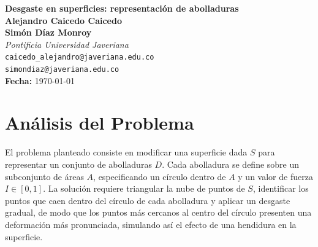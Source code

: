 \documentclass[12pt, letterpaper]{article}
\begin{document}
\begin{titlepage}
    \centering
    \vspace*{2cm}
    
    {\LARGE \textbf{Desgaste en superficies: representación de abolladuras}}\\[0.5cm]
    
    {\large \textbf{Alejandro Caicedo Caicedo}}\\
    {\large \textbf{Simón Díaz Monroy}}\\[0.3cm]
    
    \textit{Pontificia Universidad Javeriana}\\
    \texttt{caicedo\_alejandro@javeriana.edu.co}\\
    \texttt{simondiaz@javeriana.edu.co}\\[2cm]
    
    {\large \textbf{Fecha:} \today}\\[1cm]
    
    \vfill
\end{titlepage}

\newpage
\setcounter{page}{2}
\tableofcontents
\thispagestyle{empty}

\newpage
\setcounter{page}{1}

\pagestyle{fancy}
\fancyhf{}
\cfoot{\thepage}

\section{Análisis del Problema}
El problema planteado consiste en modificar una superficie dada \(S\) para representar un conjunto de abolladuras \(D\). Cada abolladura se define sobre un subconjunto de áreas \(A\), especificando un círculo dentro de \(A\) y un valor de fuerza \(I \in [0,1]\). La solución requiere triangular la nube de puntos de \(S\), identificar los puntos que caen dentro del círculo de cada abolladura y aplicar un desgaste gradual, de modo que los puntos más cercanos al centro del círculo presenten una deformación más pronunciada, simulando así el efecto de una hendidura en la superficie.
\end{document}
